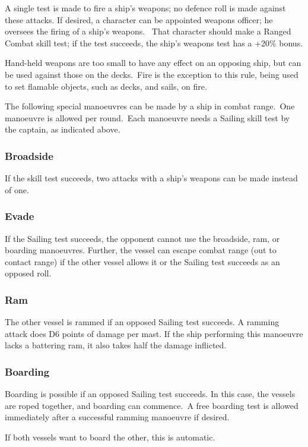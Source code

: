 A single test is made to fire a ship’s weapons; no defence roll is made against these attacks. If desired, a character can be appointed weapons officer; he oversees the firing of a ship’s weapons.  That character should make a Ranged Combat skill test; if the test succeeds, the ship’s weapons test has a +20\% bonus.

Hand-held weapons are too small to have any effect on an opposing ship, but can be used against those on the decks. Fire is the exception to this rule, being used to set flamable objects, such as decks, and sails, on fire.

The following special manoeuvres can be made by a ship in combat range. One manoeuvre is allowed per round. Each manoeuvre needs a Sailing skill test by the captain, as indicated above.

\subsubsection{Broadside}
If the skill test succeeds, two attacks with a ship’s weapons can be made instead of one.


\subsubsection{Evade}
If the Sailing test succeeds, the opponent cannot use the broadside, ram, or boarding manoeuvres. Further, the vessel can escape combat range (out to contact range) if the other vessel allows it or the Sailing test succeeds as an opposed roll.


\subsubsection{Ram}
The other vessel is rammed if an opposed Sailing test succeeds. A ramming attack does D6 points of damage per mast. If the ship performing this manoeuvre lacks a battering ram, it also takes half the damage inflicted.


\subsubsection{Boarding}
Boarding is possible if an opposed Sailing test succeeds. In this case, the vessels are roped together, and boarding can commence. A free boarding test is allowed immediately after a successful ramming manoeuvre if desired.

If both vessels want to board the other, this is automatic.


